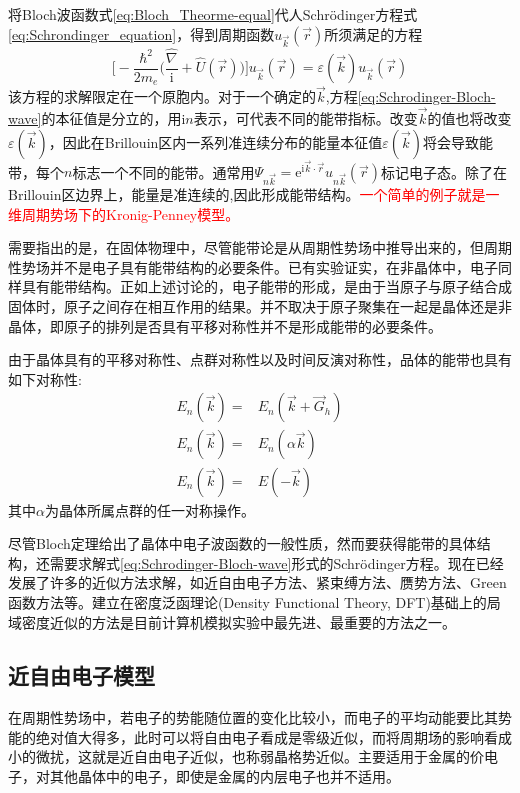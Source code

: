 将Bloch波函数式\eqref{eq:Bloch_Theorme-equal}代人Schr\"odinger方程式\eqref{eq:Schrondinger_equation}，得到周期函数$u_{\vec k}(\vec r)$所须满足的方程
\begin{equation}
	\bigg[-\dfrac{\hbar^2}{2m_e}\bigg(\dfrac{\hat{\nabla}}{\mathrm{i}}+\hat{U}(\vec r)\bigg)\bigg]u_{\vec k}(\vec r)=\varepsilon(\vec k)u_{\vec k}(\vec r)
	\label{eq:Schrodinger-Bloch-wave}
\end{equation}
该方程的求解限定在一个原胞内。对于一个确定的$\vec k$,方程\eqref{eq:Schrodinger-Bloch-wave}的本征值是分立的，用i$n$表示，可代表不同的能带指标。改变$\vec k$的值也将改变$\varepsilon(\vec k)$，因此在Brillouin区内一系列准连续分布的能量本征值$\varepsilon(\vec k)$将会导致能带，每个$n$标志一个不同的能带。通常用$\Psi_{n\vec k}=\mathrm{e}^{\mathrm{i}\vec k\cdot\vec r}u_{n\vec k}(\vec r)$标记电子态。除了在Brillouin区边界上，能量是准连续的,因此形成能带结构。\textcolor{red}{一个简单的例子就是一维周期势场下的Kronig-Penney模型。}%

需要指出的是，在固体物理中，尽管能带论是从周期性势场中推导出来的，但周期性势场并不是电子具有能带结构的必要条件。已有实验证实，在非晶体中，电子同样具有能带结构。正如上述讨论的，电子能带的形成，是由于当原子与原子结合成固体时，原子之间存在相互作用的结果。并不取决于原子聚集在一起是晶体还是非晶体，即原子的排列是否具有平移对称性并不是形成能带的必要条件。

由于晶体具有的平移对称性、点群对称性以及时间反演对称性，品体的能带也具有如下对称性:
\begin{equation}
	\begin{aligned}
		E_n(\vec k)=&E_n(\vec k+\vec G_h)\\
		E_n(\vec k)=&E_n(\alpha\vec k)\\
E_n(\vec k)=&E(-\vec k)
	\end{aligned}
	\label{eq:E_band-symmetry}
\end{equation}
其中$\alpha$为晶体所属点群的任一对称操作。

尽管Bloch定理给出了晶体中电子波函数的一般性质，然而要获得能带的具体结构，还需要求解式\eqref{eq:Schrodinger-Bloch-wave}形式的Schr\"odinger方程。现在已经发展了许多的近似方法求解，如近自由电子方法、紧束缚方法、赝势方法、Green函数方法等。建立在密度泛函理论(Density Functional Theory, DFT)基础上的局域密度近似的方法是目前计算机模拟实验中最先进、最重要的方法之一。%

\subsection{近自由电子模型} 
在周期性势场中，若电子的势能随位置的变化比较小，而电子的平均动能要比其势能的绝对值大得多，此时可以将自由电子看成是零级近似，而将周期场的影响看成小的微扰，这就是近自由电子近似，也称弱晶格势近似。主要适用于金属的价电子，对其他晶体中的电子，即使是金属的内层电子也并不适用。

